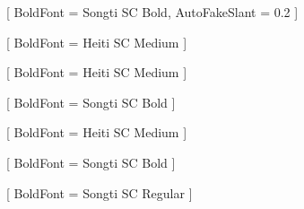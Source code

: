 %
%   
%

[
  BoldFont      = Songti SC Bold,
  AutoFakeSlant = 0.2
]

[
  BoldFont   = Heiti SC Medium
]

[
  BoldFont   = Heiti SC Medium
]

[
  BoldFont   = Songti SC Bold
]

[
  BoldFont   = Heiti SC Medium
]

[
  BoldFont   = Songti SC Bold
]

[
  BoldFont   = Songti SC Regular
]

\providecommand{\songti}{\CJKfamily{zhsong}}
\providecommand{\heiti}{\CJKfamily{zhhei}}
\providecommand{\kaishu}{\CJKfamily{zhkai}}
\providecommand{\fangsong}{\CJKfamily{zhfs}}

